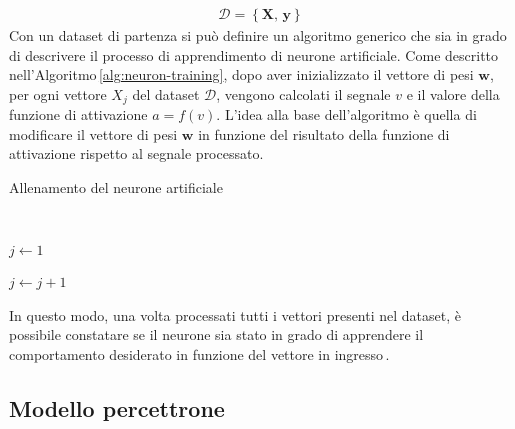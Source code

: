 % 
\begin{gather*}
    \mathcal{D} = \left\{ \mathbf{X},\, \mathbf{y} \right\}  
\end{gather*}
% 
Con un dataset di partenza si può definire un algoritmo generico che sia in grado di descrivere il processo di apprendimento di neurone artificiale. Come descritto nell'Algoritmo\,\ref{alg:neuron-training}, dopo aver inizializzato il vettore di pesi $\mathbf{w}$, per ogni vettore $X_j$ del dataset $\mathcal{D}$, vengono calcolati il segnale $v$ e il valore della funzione di attivazione $a = f(v)$. L'idea alla base dell'algoritmo è quella di modificare il vettore di pesi $\mathbf{w}$ in funzione del risultato della funzione di attivazione rispetto al segnale processato.
% 
\begin{algorithm}[ht]
    \caption{Allenamento del neurone artificiale}\label{alg:neuron-training}
    \begin{algorithmic}
        \STATE\,

        \STATE$j \gets 1$
        
            \STATE{}
            \STATE{}
            \STATE{}
            \STATE$j \gets j + 1$
        \ENDWHILE\,
    \end{algorithmic}
\end{algorithm}
% 
\noindent In questo modo, una volta processati tutti i vettori presenti nel dataset, è possibile constatare se il neurone sia stato in grado di apprendere il comportamento desiderato in funzione del vettore in ingresso\,\cite{flasinski2016introduction}.

\subsection{Modello percettrone}

